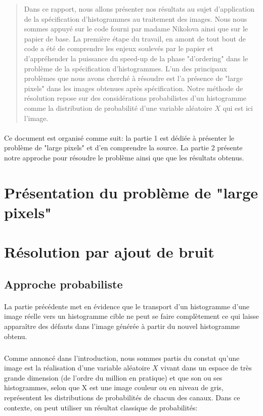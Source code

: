 \documentclass{report}
\author{Pierre Dubreuil, Thomas Eboli}
\begin{document}
\maketitle

\begin{abstract}
Dans ce rapport, nous allons présenter nos résultats au sujet d'application de la spécification d'histogrammes au traitement des images. Nous nous sommes appuyé sur le code fourni par madame Nikolova ainsi que sur le papier de base. La première étape du travail, en amont de tout bout de code a été de comprendre les enjeux soulevés par le papier et d'appréhender la puissance du speed-up de la phase "d'ordering" dans le problème de la spécification d'histogrammes. L'un des principaux problèmes que nous avons cherché à résoudre est l'a présence de "large pixels" dans les images obtenues après spécification. Notre méthode de résolution repose sur des considérations probabilistes d'un histogramme comme la distribution de probabilité d'une variable aléatoire $X$ qui est ici l'image.
\end{abstract}

\paragraph*{}
Ce document est organisé comme suit: la partie 1 est dédiée à présenter le problème de "large pixels" et d'en comprendre la source. La partie 2 présente notre approche pour résoudre le problème ainsi que que les résultats obtenus.

\section*{Présentation du problème de "large pixels"}

\section*{Résolution par ajout de bruit}
\subsection*{Approche probabiliste}
\paragraph*{}
La partie précédente met en évidence que le transport d'un histogramme d'une image réelle vers un histogramme cible ne peut se faire complètement ce qui laisse apparaître des défauts dans l'image générée à partir du nouvel histogramme obtenu.
\subparagraph*{}
Comme annoncé dans l'introduction, nous sommes partis du constat qu'une image est la réalisation d'une variable aléatoire $X$ vivant dans un espace de très grande dimension (de l'ordre du million en pratique) et que son ou ses histogrammes, selon que X est une image couleur ou en niveau de gris, représentent les distributions de probabilités de chacun des canaux. Dans ce contexte, on peut utiliser un résultat classique de probabilités:
\newline
\end{document}
